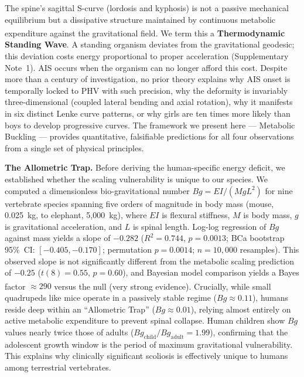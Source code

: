 \documentclass[12pt]{article}
\begin{document}
\vspace{1em}


The spine's sagittal S-curve (lordosis and kyphosis) is not a passive mechanical equilibrium but a dissipative structure maintained by continuous metabolic expenditure against the gravitational field\textsuperscript{\cite{latimer2005,thompson1917}}. We term this a \textbf{Thermodynamic Standing Wave}. A standing organism deviates from the gravitational geodesic; this deviation costs energy proportional to proper acceleration (Supplementary Note~1). AIS occurs when the organism can no longer afford this cost. Despite more than a century of investigation, no prior theory explains why AIS onset is temporally locked to PHV with such precision, why the deformity is invariably three-dimensional (coupled lateral bending and axial rotation), why it manifests in six distinct Lenke curve patterns, or why girls are ten times more likely than boys to develop progressive curves. The framework we present here --- Metabolic Buckling --- provides quantitative, falsifiable predictions for all four observations from a single set of physical principles.

\textbf{The Allometric Trap.} Before deriving the human-specific energy deficit, we established whether the scaling vulnerability is unique to our species. We computed a dimensionless bio-gravitational number $Bg = EI/(MgL^2)$ for nine vertebrate species spanning five orders of magnitude in body mass (mouse, 0.025~kg, to elephant, 5{,}000~kg), where $EI$ is flexural stiffness, $M$ is body mass, $g$ is gravitational acceleration, and $L$ is spinal length. Log-log regression of $Bg$ against mass yields a slope of $-0.282$ ($R^2 = 0.744$, $p = 0.0013$; BCa bootstrap 95\%~CI: $[-0.405, -0.170]$; permutation $p = 0.0014$; $n = 10{,}000$ resamples). This observed slope is not significantly different from the metabolic scaling prediction of $-0.25$ ($t(8) = 0.55$, $p = 0.60$), and Bayesian model comparison yields a Bayes factor $\approx 290$ versus the null (very strong evidence)\textsuperscript{\cite{west1997}}. Crucially, while small quadrupeds like mice operate in a passively stable regime ($Bg \approx 0.11$), humans reside deep within an ``Allometric Trap'' ($Bg \approx 0.01$), relying almost entirely on active metabolic expenditure to prevent spinal collapse. Human children show $Bg$ values nearly twice those of adults ($Bg_{\text{child}}/Bg_{\text{adult}} = 1.99$), confirming that the adolescent growth window is the period of maximum gravitational vulnerability. This explains why clinically significant scoliosis is effectively unique to humans among terrestrial vertebrates.
\end{document}
